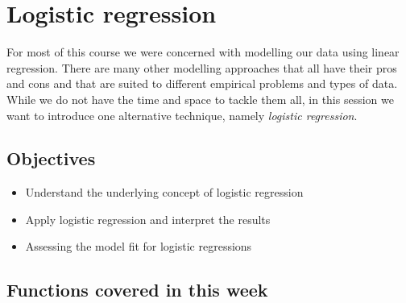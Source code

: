 \documentclass[
]{book}
\providecommand{\tightlist}{%
  \setlength{\itemsep}{0pt}\setlength{\parskip}{0pt}}
\begin{document}
\hypertarget{log-est}{%
\chapter{Logistic regression}\label{log-est}}

For most of this course we were concerned with modelling our data using
linear regression. There are many
other modelling approaches that all have their pros and cons and that
are suited to different empirical problems and types of data. While we
do not have the time and space to tackle them all, in this session we
want to introduce one alternative technique, namely \emph{logistic regression}.

\hypertarget{objectives-8}{%
\section{Objectives}\label{objectives-8}}

\begin{itemize}
\tightlist
\item
  Understand the underlying concept of logistic regression
\item
  Apply logistic regression and interpret the results
\item
  Assessing the model fit for logistic regressions
\end{itemize}

\hypertarget{functions-covered-in-this-week}{%
\section{Functions covered in this week}\label{functions-covered-in-this-week}}
\end{document}
